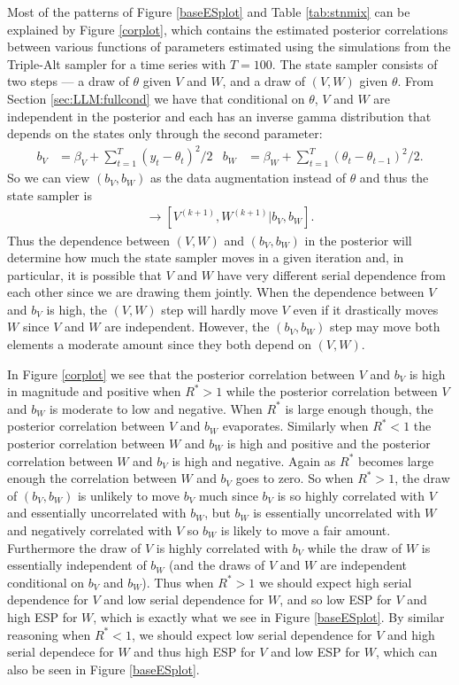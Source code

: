 \documentclass{article}
\begin{document}
Most of the patterns of Figure \ref{baseESplot} and Table \ref{tab:stnmix} can be explained by Figure \ref{corplot}, which contains the estimated posterior correlations between various functions of parameters estimated using the simulations from the Triple-Alt sampler for a time series with $T=100$. The state sampler consists of two steps --- a draw of $\theta$ given $V$ and $W$, and a draw of $(V,W)$ given $\theta$. From Section \ref{sec:LLM:fullcond} we have that conditional on $\theta$, $V$ and $W$ are independent in the posterior and each has an inverse gamma distribution that depends on the states only through the second parameter:
\begin{align*}
  b_V &= \beta_V + \sum_{t=1}^T(y_t - \theta_t)^2/2 &
  b_W &= \beta_W + \sum_{t=1}^T(\theta_t - \theta_{t-1})^2/2.
\end{align*}
So we can view $(b_V,b_W)$ as the data augmentation instead of $\theta$ and thus the state sampler is
\begin{align*}
  [b_V, b_W|V^{(k)},W^{(k)}] \to [V^{(k+1)},W^{(k+1)}|b_V,b_W].
\end{align*}
Thus the dependence between $(V,W)$ and $(b_V,b_W)$ in the posterior will determine how much the state sampler moves in a given iteration and, in particular, it is possible that $V$ and $W$ have very different serial dependence from each other since we are drawing them jointly. When the dependence between $V$ and $b_V$ is high, the $(V,W)$ step will hardly move $V$ even if it drastically moves $W$ since $V$ and $W$ are independent. However, the $(b_V,b_W)$ step may move both elements a moderate amount since they both depend on $(V,W)$.

In Figure \ref{corplot} we see that the posterior correlation between $V$ and $b_V$ is high in magnitude and positive when $R^*>1$ while the posterior correlation between $V$ and $b_W$ is moderate to low and negative. When $R^*$ is large enough though, the posterior correlation between $V$ and $b_W$ evaporates. Similarly when $R^*<1$ the posterior correlation between $W$ and $b_W$ is high and positive and the posterior correlation between $W$ and $b_V$ is high and negative. Again as $R^*$ becomes large enough the correlation between $W$ and $b_V$ goes to zero. So when $R^*>1$, the draw of $(b_V, b_W)$ is unlikely to move $b_V$ much since $b_V$ is so highly correlated with $V$ and essentially uncorrelated with $b_W$, but $b_W$ is essentially uncorrelated with $W$ and negatively correlated with $V$ so $b_W$ is likely to move a fair amount. Furthermore the draw of $V$ is highly correlated with $b_V$ while the draw of $W$ is essentially independent of $b_W$ (and the draws of $V$ and $W$ are independent conditional on $b_V$ and $b_W$). Thus when $R^*>1$ we should expect high serial dependence for $V$ and low serial dependence for $W$, and so low ESP for $V$ and high ESP for $W$, which is exactly what we see in Figure \ref{baseESplot}. By similar reasoning when $R^*<1$, we should expect low serial dependence for $V$ and high serial dependece for $W$ and thus high ESP for $V$ and low ESP for $W$, which can also be seen in Figure \ref{baseESplot}.
\end{document}
